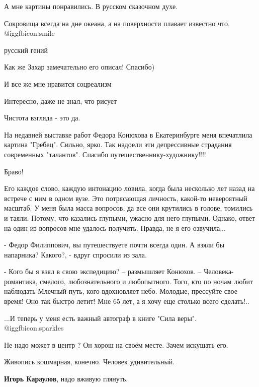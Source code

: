 \begin{itemize}
А мне картины понравились. В русском сказочном духе.

Сокровища всегда на дне океана, а на поверхности плавает известно что.  @igg{fbicon.smile} 

русский гений

Как же Захар замечательно его описал! Спасибо)

И все же мне нравится соцреализм

Интересно, даже не знал, что рисует

Чистота взгляда - это да.


На недавней выставке работ Федора Конюхова в Екатеринбурге меня впечатлила
картина "Гребец". Сильно, ярко. Так надоели эти депрессивные страдания
современных "талантов". Спасибо путешественнику-художнику!!!!


Браво!


Его каждое слово, каждую интонацию ловила, когда была несколько лет назад на
встрече с ним в одном вузе. Это потрясающая личность, какой-то невероятный
масштаб. У меня была масса вопросов, да все они крутились в голове, томились и
таяли. Потому, что казались глупыми, ужасно для него глупыми. Однако, ответ на
один из вопросов мне удалось получить. Правда, не я его озвучила...

- Федор Филиппович, вы путешествуете почти всегда один. А взяли бы напарника?
Какого?, - вдруг спросили из зала.

- Кого бы я взял в свою экспедицию? – размышляет Конюхов. –
Человека­-романтика, смелого, любознательного и любопытного. Того, кто по ночам
любит наблюдать Млечный путь, кого вдохновляет небо. Молодые, прессуйте свое
время! Оно так быстро летит! Мне 65 лет, а я хочу еще столько всего сделать!..

...И теперь у меня есть важный автограф в книге "Сила веры". @igg{fbicon.sparkles} 

Не надо может в центр ? Он хорош на своём месте. Зачем искушать его.

Живопись кошмарная, конечно. Человек удивительный.

\begin{itemize} %
\textbf{Игорь Караулов}, надо вживую глянуть.


\end{itemize}
\end{itemize}
